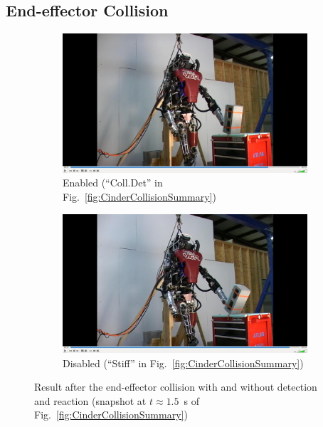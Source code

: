 \subsection{End-effector Collision}
\label{sec:CollDet_EE}
%
\begin{figure}
\begin{subfigure}{.24\textwidth}
  \centering
  \includegraphics[trim=550 250 350 100,clip,width=.98\linewidth]{figures/CollDetCinderblock/ImpCtrlv5_E057_R04_impCtrl_K300_wall_colldet_move_away_021.jpg}
  \caption{Enabled (``Coll.Det'' in Fig.~\ref{fig:CinderCollisionSummary})}
  \label{fig:CinderColl_zerog}
\end{subfigure}%
\begin{subfigure}{.24\textwidth}
  \centering
  \includegraphics[trim=550 250 350 100,clip,width=.98\linewidth]{figures/CollDetCinderblock/ImpCtrlv5_E057_R05_impCtrl_K300_wall_nocolldet_collision_022.jpg}
  \caption{Disabled (``Stiff'' in Fig.~\ref{fig:CinderCollisionSummary})}
  \label{fig:CinderColl_push}
\end{subfigure}
\caption{Result after the end-effector collision with and without detection and reaction (snapshot at $t\approx1.5$~s of Fig.~\ref{fig:CinderCollisionSummary})}
\label{fig:CinderCollPictures}
\SkipBeforeText
\end{figure}
